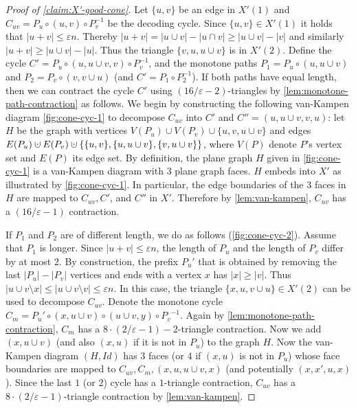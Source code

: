 \documentclass[10pt,a4paper]{article}
\newcommand{\prettyref}[1]{\cref{#1}}
\theoremstyle{definition}
\theoremstyle{remark}
\newcommand{\abs}[1]{\lvert#1\rvert}
\newcommand{\set}[1]{\{#1\}}
\renewcommand{\leq}{\leqslant}
\renewcommand{\le}{\leqslant}
\renewcommand{\geq}{\geqslant}
\renewcommand{\ge}{\geqslant}
\numberwithin{equation}{section}
\newcommand{\dunion}{\mathbin{\mathaccent\cdot\cup}}
\let\pref=\prettyref
\begin{document}
\begin{proof}[Proof of \pref{claim:X'-good-cone}]
    Let \(\set{u,v}\) be an edge in $X'(1)$ and \(C_{uv} = P_u\circ (u,v) \circ P_v^{-1}\) be the decoding cycle. Since \(\set{u,v} \in X'(1)\) it holds that \(\abs{u + v} \leq \varepsilon n\). Thereby \(\abs{u + v} = \abs{u \cup v} - \abs{u \cap v} \geq \abs{u \cup v} - \abs{v}\) and similarly \(\abs{u + v} \geq \abs{u \cup v} - \abs{u}\). Thus the triangle \(\set{v,u,u \cup v}\) is in \(X'(2)\). 
    Define the cycle \(C'=P_u \circ (u,u\cup v,v) \circ P_{v}^{-1}\), and the monotone paths \(P_1 = P_u \circ (u,u \cup v)\) and \(P_2 = P_v \circ (v,v \cup u)\) (and \(C' = P_1 \circ P_2^{-1}\)). 
    If both paths have equal length, then we can contract the cycle $C'$ using \((16/\varepsilon - 2)\)-triangles by \pref{lem:monotone-path-contraction} as follows. We begin by constructing the following van-Kampen diagram \pref{fig:cone-cyc-1} to decompose $C_{uv}$ into $C'$ and $C'' = (u,u\cup v, v, u)$: let $H$ be the graph with vertices $V(P_u)\cup V(P_v) \cup \{u,v,u\cup v\}$ and edges $E(P_u)\dunion E(P_v) \dunion \{\set{u,v},\set{u,u\cup v}, \set{v,u\cup v}\}$, where \(V(P)\) denote  \(P\)'s vertex set and \(E(P)\) its edge set. By definition, the plane graph $H$ given in \pref{fig:cone-cyc-1} is a van-Kampen diagram with $3$ plane graph faces. 
    $H$ embeds into $X'$ as illustrated by \pref{fig:cone-cyc-1}. In particular, the edge boundaries of the $3$ faces in $H$ are mapped to $ C_{uv}, C'$, and $ C''$ in $X'$. Therefore by \pref{lem:van-kampen}, $C_{uv}$ has a \((16/\varepsilon - 1)\) contraction.
    
    If $P_1$ and $P_2$ are of different length, we do as follows (\pref{fig:cone-cyc-2}). Assume that \(P_1\) is longer. Since $\abs{u+v} \le \varepsilon n$, the length of $P_u$ and the length of $P_v$ differ by at most $2$. By construction, the prefix \(P_u'\) that is obtained by removing the last $\abs{P_u} - \abs{P_v}$ vertices and ends with a vertex \(x\) has \(\abs{x} \ge \abs{v}\). Thus $\abs{u\cup v \setminus x} \le \abs{u \cup v\setminus v} \le \varepsilon n$. In this case, the triangle \(\set{x,u,v \cup u} \in X'(2)\) can be used to decompose \(C_{uv}\). Denote the monotone cycle $C_m = P_u'\circ (x,u\cup v)\circ (u\cup v,y)\circ {P_v}^{-1}$. Again by \pref{lem:monotone-path-contraction}, $C_m$ has a \(8 \cdot (2/\varepsilon - 1) -2 \)-triangle contraction. 
    Now we add $(x,u\cup v)$ (and also $(x,u)$ if it is not in $P_u$) to the graph $H$. Now the van-Kampen diagram $(H,Id)$ has $3$ faces (or $4$ if $(x,u)$ is not in $P_u$) whose face boundaries are mapped to $C_{uv},C_m,  (x,u,u\cup v,x)$ (and potentially $(x,x',u,x)$). Since the last $1$ (or $2$) cycle has a $1$-triangle contraction, $C_{uv}$ has a \(8 \cdot (2/\varepsilon - 1)\)-triangle contraction by \pref{lem:van-kampen}.

\end{proof}
\end{document}
